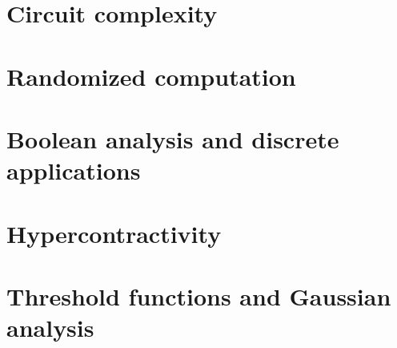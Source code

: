 \part{Circuit complexity}










\part{Randomized computation}








\part{Boolean analysis and discrete applications}




\part{Hypercontractivity}






\part{Threshold functions and Gaussian analysis}









